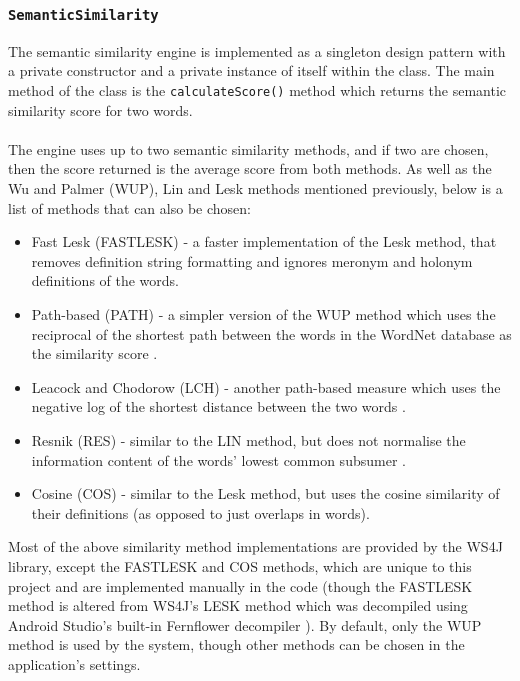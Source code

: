 \documentclass[11pt]{article}
\begin{document}
\subsubsection{\texttt{SemanticSimilarity}}
\label{section:semantic-impl}

The semantic similarity engine is implemented as a singleton design pattern with a private constructor and a private instance of itself within the class. The main method of the class is the \texttt{calculateScore()} method which returns the semantic similarity score for two words.
\\
\\
The engine uses up to two semantic similarity methods, and if two are chosen, then the score returned is the average score from both methods. As well as the Wu and Palmer (WUP), Lin and Lesk methods mentioned previously, below is a list of methods that can also be chosen: 

\begin{itemize}
\item Fast Lesk (FASTLESK) - a faster implementation of the Lesk method, that removes definition string formatting and ignores meronym and holonym definitions of the words.

\item Path-based (PATH) - a simpler version of the WUP method which uses the reciprocal of the shortest path between the words in the WordNet database as the similarity score \cite{RefWorks:46}.

\item Leacock and Chodorow (LCH) - another path-based measure which uses the negative log of the shortest distance between the two words \cite{RefWorks:46}.

\item Resnik (RES) - similar to the LIN method, but does not normalise the information content of the words' lowest common subsumer \cite{RefWorks:46}.

\item Cosine (COS) - similar to the Lesk method, but uses the cosine similarity of their definitions (as opposed to just overlaps in words).
\end{itemize}

Most of the above similarity method implementations are provided by the WS4J library, except the FASTLESK and COS methods, which are unique to this project and are implemented manually in the code (though the FASTLESK method is altered from WS4J's LESK method which was decompiled using Android Studio's built-in Fernflower decompiler \cite{RefWorks:124}). By default, only the WUP method is used by the system, though other methods can be chosen in the application's settings.
\end{document}
